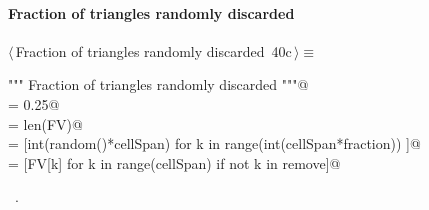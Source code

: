\documentclass[11pt,oneside]{article}    %
\begin{document}
\paragraph{Fraction of triangles randomly discarded}
\begin{flushleft} \small \label{scrap63}
\protect{}$\langle\,$Fraction of triangles randomly discarded\nobreak\ {\footnotesize 40c}$\,\rangle\equiv$
\vspace{-1ex}
\begin{list}{}{} \item
\mbox{}\verb@""" Fraction of triangles randomly discarded """@\\
\mbox{}\verb@fraction = 0.25@\\
\mbox{}\verb@cellSpan = len(FV)@\\
\mbox{}\verb@remove = [int(random()*cellSpan) for k in range(int(cellSpan*fraction)) ]@\\
\mbox{}\verb@FV = [FV[k] for k in range(cellSpan) if not k in remove]@\\
\mbox{}\verb@@{\NWsep}
\end{list}
\vspace{-1ex}
\footnotesize\addtolength{\baselineskip}{-1ex}
\begin{list}{}{\setlength{\itemsep}{-\parsep}\setlength{\itemindent}{-\leftmargin}}
\item \NWtxtMacroRefIn\ .
\end{list}
\end{flushleft}
\end{document}
